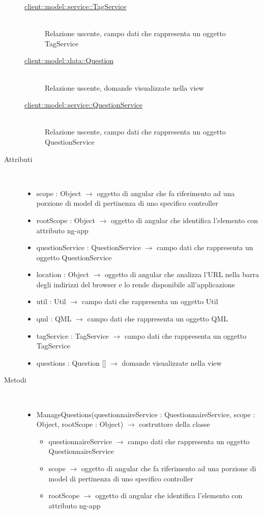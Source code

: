 \begin{description}
\begin{description}
	\item[\hyperlink{client::model::service::TagService}{client::model::service::TagService}] \hfill \\
	Relazione uscente, campo dati che rappresenta un oggetto TagService
	\item[\hyperlink{client::model::data::Question}{client::model::data::Question}] \hfill \\
	Relazione uscente, domande visualizzate nella view
	\item[\hyperlink{client::model::service::QuestionService}{client::model::service::QuestionService}] \hfill \\
	Relazione uscente, campo dati che rappresenta un oggetto QuestionService
\end{description}

\item[Attributi] \hfill \\
\vspace{-7mm}
\begin{itemize}
	\item scope : Object $\rightarrow$ oggetto di angular che fa riferimento ad una porzione di model di pertinenza di uno specifico controller
	\item rootScope : Object $\rightarrow$ oggetto di angular che identifica l’elemento con attributo ng-app
	\item questionService : QuestionService $\rightarrow$ campo dati che rappresenta un oggetto QuestionService
	\item location : Object $\rightarrow$ oggetto di angular che analizza l'URL nella barra degli indirizzi del browser e lo rende disponibile all'applicazione
	\item util : Util $\rightarrow$ campo dati che rappresenta un oggetto Util
	\item qml : QML $\rightarrow$ campo dati che rappresenta un oggetto QML
	\item tagService : TagService $\rightarrow$ campo dati che rappresenta un oggetto TagService
	\item questions : Question [] $\rightarrow$ domande visualizzate nella view
\end{itemize}

\item[Metodi] \hfill \\
\vspace{-7mm}
\begin{itemize}
	\item ManageQuestions(questionnaireService : QuestionnaireService, scope : Object, rootScope : Object) $\rightarrow$ costruttore della classe\begin{itemize}
		\item questionnaireService $\rightarrow$ campo dati che rappresenta un oggetto QuestionnaireService
		\item scope $\rightarrow$ oggetto di angular che fa riferimento ad una porzione di model di pertinenza di uno specifico controller
		\item rootScope $\rightarrow$ oggetto di angular che identifica l’elemento con attributo ng-app
	\end{itemize}
	

\end{itemize}
\end{description}
